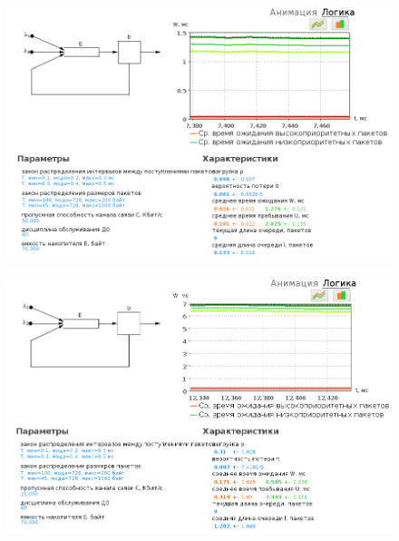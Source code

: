 \documentclass[12pt, a4paper] {ncc}
\begin{document}
		\begin{figure}[h!]
			\includegraphics[scale=0.5]{./img/pq_50000_70000.png}
		\end{figure}
		\begin{figure}[h!]
			\includegraphics[scale=0.5]{./img/pq_25000_70000.png}
		\end{figure}
\end{document}
